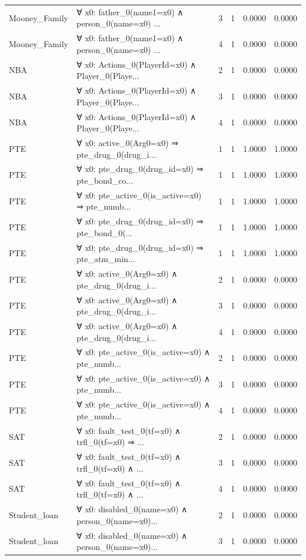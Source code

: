 \documentclass[11pt,a4paper]{article}
\begin{document}
\begin{table}[h!]
\begin{longtable}{|l|p{6cm}|c|c|c|c|}
Mooney_Family & ∀ x0: father\_0(name1=x0) ∧ person\_0(name=x0) ... & 3 & 1 & 0.0000 & 0.0000 \\
Mooney_Family & ∀ x0: father\_0(name1=x0) ∧ person\_0(name=x0) ... & 4 & 1 & 0.0000 & 0.0000 \\
NBA & ∀ x0: Actions\_0(PlayerId=x0) ∧ Player\_0(Playe... & 2 & 1 & 0.0000 & 0.0000 \\
NBA & ∀ x0: Actions\_0(PlayerId=x0) ∧ Player\_0(Playe... & 3 & 1 & 0.0000 & 0.0000 \\
NBA & ∀ x0: Actions\_0(PlayerId=x0) ∧ Player\_0(Playe... & 4 & 1 & 0.0000 & 0.0000 \\
PTE & ∀ x0: active\_0(Arg0=x0) ⇒ pte\_drug\_0(drug\_i... & 1 & 1 & 1.0000 & 1.0000 \\
PTE & ∀ x0: pte\_drug\_0(drug\_id=x0) ⇒ pte\_bond\_co... & 1 & 1 & 1.0000 & 1.0000 \\
PTE & ∀ x0: pte\_active\_0(is\_active=x0) ⇒ pte\_numb... & 1 & 1 & 1.0000 & 1.0000 \\
PTE & ∀ x0: pte\_drug\_0(drug\_id=x0) ⇒ pte\_bond\_0(... & 1 & 1 & 1.0000 & 1.0000 \\
PTE & ∀ x0: pte\_drug\_0(drug\_id=x0) ⇒ pte\_atm\_min... & 1 & 1 & 1.0000 & 1.0000 \\
PTE & ∀ x0: active\_0(Arg0=x0) ∧ pte\_drug\_0(drug\_i... & 2 & 1 & 0.0000 & 0.0000 \\
PTE & ∀ x0: active\_0(Arg0=x0) ∧ pte\_drug\_0(drug\_i... & 3 & 1 & 0.0000 & 0.0000 \\
PTE & ∀ x0: active\_0(Arg0=x0) ∧ pte\_drug\_0(drug\_i... & 4 & 1 & 0.0000 & 0.0000 \\
PTE & ∀ x0: pte\_active\_0(is\_active=x0) ∧ pte\_numb... & 2 & 1 & 0.0000 & 0.0000 \\
PTE & ∀ x0: pte\_active\_0(is\_active=x0) ∧ pte\_numb... & 3 & 1 & 0.0000 & 0.0000 \\
PTE & ∀ x0: pte\_active\_0(is\_active=x0) ∧ pte\_numb... & 4 & 1 & 0.0000 & 0.0000 \\
SAT & ∀ x0: fault\_test\_0(tf=x0) ∧ trfl\_0(tf=x0) ⇒ ... & 2 & 1 & 0.0000 & 0.0000 \\
SAT & ∀ x0: fault\_test\_0(tf=x0) ∧ trfl\_0(tf=x0) ∧ ... & 3 & 1 & 0.0000 & 0.0000 \\
SAT & ∀ x0: fault\_test\_0(tf=x0) ∧ trfl\_0(tf=x0) ∧ ... & 4 & 1 & 0.0000 & 0.0000 \\
Student_loan & ∀ x0: disabled\_0(name=x0) ∧ person\_0(name=x0)... & 2 & 1 & 0.0000 & 0.0000 \\
Student_loan & ∀ x0: disabled\_0(name=x0) ∧ person\_0(name=x0)... & 3 & 1 & 0.0000 & 0.0000 \\

\end{longtable}
\end{table}
\end{document}
